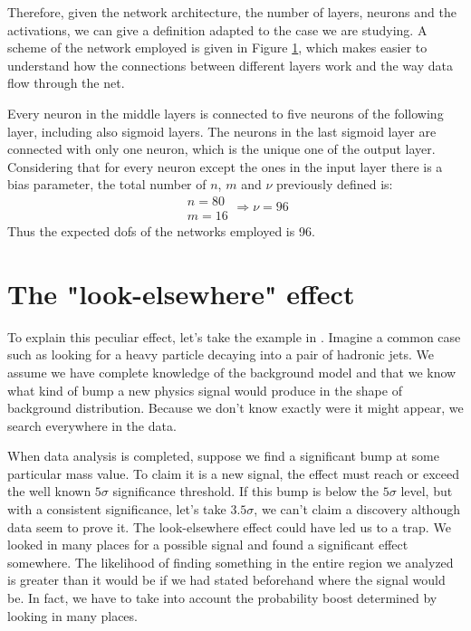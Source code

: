 Therefore, given the network architecture, the number of layers, neurons and the activations, we can give a definition adapted to the case we are studying. A scheme of the network employed is given in Figure \ref{fig:DOF}, which makes easier to understand how the connections between different layers work and the way data flow through the net.

\begin{figure}[H]
    \centering
    
    \label{fig:DOF}
\end{figure}

Every neuron in the middle layers is connected to five neurons of the following layer, including also sigmoid layers. The neurons in the last sigmoid layer are connected with only one neuron, which is the unique one of the output layer. Considering that for every neuron except the ones in the input layer there is a bias parameter, the total number of $n$, $m$ and $\nu$ previously defined is:
\begin{equation}
	\begin{array}{l}
	n = 80\\
	m = 16
	\end{array}
	\Longrightarrow
	\nu = 96
\end{equation}
Thus the expected dofs of the networks employed is 96.



\section{The "look-elsewhere" effect}
To explain this peculiar effect, let's take the example in \cite{look-elsewhere}. Imagine a common case such as looking for a heavy particle decaying into a pair of hadronic jets. We assume we have complete knowledge of the background model and that we know what kind of bump a new physics signal would produce in the shape of background distribution. Because we don't know exactly were it might appear, we search everywhere in the data.

When data analysis is completed, suppose we find a significant bump at some particular mass value. To claim it is a new signal, the effect must reach or exceed the well known $5\sigma$ significance threshold. If this bump is below the $5\sigma$ level, but with a consistent significance, let's take $3.5\sigma$, we can't claim a discovery although data seem to prove it. The look-elsewhere effect could have led us to a trap. We looked in many places for a possible signal and found a significant effect somewhere. The likelihood of finding something in the entire region we analyzed is greater than it would be if we had stated beforehand where the signal would be. In fact, we have to take into account the probability boost determined by looking in many places.

